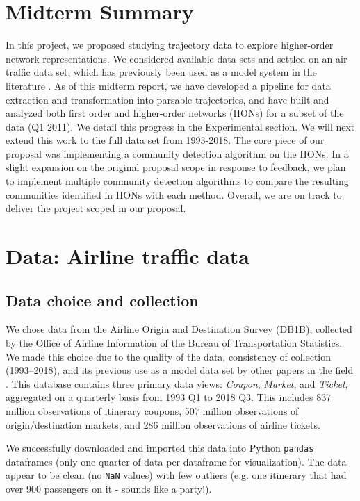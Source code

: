 \documentclass[sigconf]{acmart}
\begin{document}
\section{Midterm Summary}
In this project, we proposed studying trajectory data to explore higher-order network representations. We considered available data sets and settled on an air traffic data set, which has previously been used as a model system in the literature \cite{Rosvall2014}. As of this midterm report, we have developed a pipeline for data extraction and transformation into parsable trajectories, and have built and analyzed both first order and higher-order networks (HONs) for a subset of the data (Q1 2011). We detail this progress in the Experimental section. We will next extend this work to the full data set from 1993-2018. The core piece of our proposal was implementing a community detection algorithm on the HONs. In a slight expansion on the original proposal scope in response to feedback, we plan to implement multiple community detection algorithms to compare the resulting communities identified in HONs with each method. Overall, we are on track to deliver the project scoped in our proposal.


\section{Data: Airline traffic data}

\subsection{Data choice and collection}
We chose data from the Airline Origin and Destination Survey (DB1B), collected by the Office of Airline Information of the Bureau of Transportation Statistics. We made this choice due to the quality of the data, consistency of collection (1993--2018), and its previous use as a model data set by other papers in the field \cite{AirlineData}. This database contains three primary data views: \textit{Coupon}, \textit{Market}, and \textit{Ticket}, aggregated on a quarterly basis from 1993 Q1 to 2018 Q3. This includes 837 million observations of itinerary coupons, 507 million observations of origin/destination markets, and 286 million observations of airline tickets.

We successfully downloaded and imported this data into Python \texttt{pandas} dataframes (only one quarter of data per dataframe for visualization). The data appear to be clean (no \texttt{NaN} values) with few outliers (e.g. one itinerary that had over 900 passengers on it - sounds like a party!).
\end{document}
